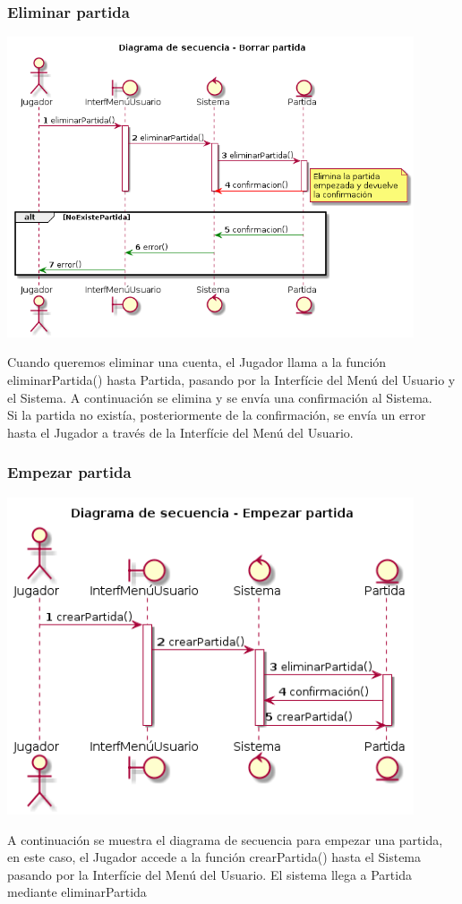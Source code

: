 \subsubsection{Eliminar partida}
\begin{center}
  \includegraphics[width=0.9\textwidth]{./imatges/jugador/Eliminar_partida.png}
  \end{center}
  Cuando queremos eliminar una cuenta, el Jugador llama a la función eliminarPartida() hasta Partida, pasando por la Interfície del Menú del Usuario y el Sistema. A continuación se elimina y se envía una confirmación al Sistema.
  \\Si la partida no existía, posteriormente de la confirmación, se envía un error hasta el Jugador a través de la Interfície del Menú del Usuario.
  

\subsubsection{Empezar partida}
\begin{center}
  \includegraphics[width=0.9\textwidth]{./imatges/jugador/Empezar_partida.png}
  \end{center}
  A continuación se muestra el diagrama de secuencia para empezar una partida, en este caso, el Jugador accede a la función crearPartida() hasta el Sistema pasando por la Interfície del Menú del Usuario. El sistema llega a Partida mediante eliminarPartida
  
